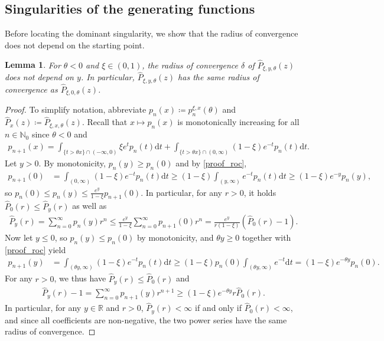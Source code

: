 \documentclass[10pt,a4paper]{amsart}
\newcommand{\N}{\mathbb{N}} %
\newcommand{\R}{\mathbb{R}} %
\newcommand{\1}{\mathds{1}}
\renewcommand{\d}{\mathrm{d}}
\newtheorem{Lemma}[definition]{Lemma}
\begin{document}
\subsection{Singularities of the generating functions}
Before locating the dominant singularity, we show that the radius of convergence does not depend on the starting point.
\begin{Lemma}\label{roc_P_not_depending_on_y}
     For $\theta<0$ and $\xi\in(0,1)$, the radius of convergence $\delta$ of $\hat{P}_{\xi,y,\theta}(z)$ does not depend on $y$. In particular, $\hat{P}_{\xi,y,\theta}(z)$ has the same radius of convergence as $\hat{P}_{\xi,0,\theta}(z)$.
\end{Lemma}
\begin{proof}
    To simplify notation, abbreviate $p_n(x)\coloneqq p_n^{\xi,x}(\theta)$ and $\hat{P}_x(z)\coloneqq \hat{P}_{\xi,x,\theta}(z)$. Recall that $x\mapsto p_n(x)$ is monotonically increasing for all $n\in\N_0$ since $\theta<0$ and 
    \begin{align}\label{proof_roc}
        p_{n+1}(x)=\int_{\{t>\theta x\}\cap(-\infty,0)}\xi  e^tp_n(t)\d t+\int_{\{t>\theta x\}\cap(0,\infty)}(1-\xi)  e^{-t}p_n(t)\d t.
    \end{align}
Let $y>0$. By monotonicity, $p_n(y)\geq p_n(0)$ and by \eqref{proof_roc},
\begin{align*}
   p_{n+1}(0)&= \int_{(0,\infty)}(1-\xi)  e^{-t}p_n(t)\d t
   \ge (1-\xi)\int_{(y,\infty)}  e^{-t}p_n(t)\d t
   \ge (1-\xi)e^{-y}p_n(y),
\end{align*}
so $p_n(0)\le p_n(y)\le\frac{e^y}{1-\xi}p_{n+1}(0)$. In particular, for any $r>0$, it holds $\hat{P}_0(r)\le\hat P_y(r)$ as well as
\begin{align*}
    \hat P_y(r)=\sum_{n=0}^\infty p_n(y)r^n\le \frac{e^y}{1-\xi}\sum_{n=0}^\infty p_{n+1}(0)r^n=\frac{e^y}{r(1-\xi)}(\hat P_0(r)-1).
\end{align*}
Now let $y\le 0$, so $p_n(y)\le p_n(0)$ by monotonicity, and $\theta y\ge 0$ together with \eqref{proof_roc} yield
\begin{align*}
    p_{n+1}(y)&= \int_{(\theta y,\infty)}(1-\xi)  e^{-t}p_n(t)\d t
   \ge (1-\xi)p_n(0)\int_{(\theta y,\infty)}  e^{-t}\d t
   =(1-\xi)e^{-\theta y}p_n(0).
\end{align*}
For any $r>0$, we thus have $\hat P_y(r)\le \hat P_0(r)$ and 
\begin{align*}
     \hat P_y(r)-1=\sum_{n=0}^\infty p_{n+1}(y)r^{n+1}\ge (1-\xi)e^{-\theta y} r \hat P_0(r).
\end{align*}
In particular, for any $y\in\R$ and $r>0$, $\hat P_y(r)<\infty$ if and only if $\hat P_0(r)<\infty$, and since all coefficients are non-negative, the two power series have the same radius of convergence.
\end{proof} 
\end{document}
